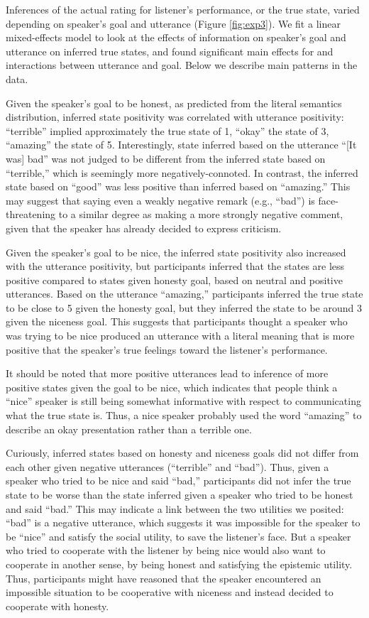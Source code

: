 \documentclass[10pt,letterpaper]{article}
\begin{document}
Inferences of the actual rating for listener's performance, or the true state, varied depending on speaker's goal and utterance (Figure \ref{fig:exp3}). We fit a linear mixed-effects model to look at the effects of information on speaker's goal and utterance on inferred true states, and found significant main effects for and interactions between utterance and goal. Below we describe main patterns in the data.

Given the speaker's goal to be honest, as predicted from the literal semantics distribution, inferred state positivity was correlated with utterance positivity: ``terrible'' implied approximately the true state of 1, ``okay'' the state of 3, ``amazing'' the state of 5. Interestingly, state inferred based on the utterance ``[It was] bad'' was not judged to be different from the inferred state based on ``terrible,'' which is seemingly more negatively-connoted. In contrast, the inferred state based on ``good'' was less positive than inferred based on ``amazing.'' This may suggest that saying even a weakly negative remark (e.g., ``bad'') is face-threatening to a similar degree as making a more strongly negative comment, given that the speaker has already decided to express criticism.

Given the speaker's goal to be nice, the inferred state positivity also increased with the utterance positivity, but participants inferred that the states are less positive compared to states given honesty goal, based on neutral and positive utterances. Based on the utterance ``amazing,'' participants inferred the true state to be close to 5 given the honesty goal, but they inferred the state to be around 3 given the niceness goal. This suggests that participants thought a speaker who was trying to be nice produced an utterance  with a literal meaning that is more positive that the speaker's true feelings toward the listener's performance.

It should be noted that more positive utterances lead to inference of more positive states given the goal to be nice, which indicates that people think a ``nice'' speaker is still being somewhat informative with respect to communicating what the true state is. Thus, a nice speaker probably used the word ``amazing'' to describe an okay presentation rather than a terrible one.

Curiously, inferred states based on honesty and niceness goals did not differ from each other given negative utterances (``terrible'' and ``bad''). Thus, given a speaker who tried to be nice and said ``bad,'' participants did not infer the true state to be worse than the state inferred given a speaker who tried to be honest and said ``bad.'' This may indicate a link between the two utilities we posited: ``bad'' is a negative utterance, which suggests it was impossible for the speaker to be ``nice'' and satisfy the social utility, to save the listener's face. But a speaker who tried to cooperate with the listener by being nice would also want to cooperate in another sense, by being honest and satisfying the epistemic utility.  Thus, participants might have reasoned that the speaker encountered an impossible situation to be cooperative with niceness and instead decided to cooperate with honesty. 
\end{document}

